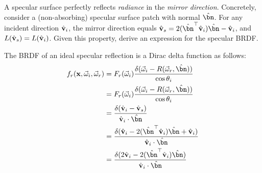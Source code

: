 \begin{problem}
\begin{enumroman}
    \newpage
    \item A specular surface perfectly reflects \emph{radiance} in the
      \emph{mirror direction}. Concretely, consider a (non-absorbing)
      specular surface patch with normal $\hat{\bn}$.
      For any incident direction $\hat{\mathbf{v}}_i$, the mirror direction
      equals $\hat{\bv}_s = 2(\hat{\bn}^\top \hat{\bv}_i)\hat{\bn} - \hat{\bv}_i$,
      and $L(\hat{\mathbf{v}}_s) = L(\hat{\mathbf{v}}_i)$.
      Given this property, derive an expression for the specular BRDF.
      \begin{answer}
        The BRDF of an ideal specular reflection is a Dirac delta function as follows:
        \begin{align*}
          f_r(\bx, \vec{\omega}_i, \vec{\omega}_r) &= F_r(\vec{\omega}_i)
            \frac{\delta(\vec{\omega}_i - R(\vec{\omega}_r, \hat{\bn}))}{\cos \theta_i} \\
          &= F_r(\vec{\omega}_i) \frac{\delta(\vec{\omega}_i - R(\vec{\omega}_r,
            \hat{\bn}))}{\cos \theta_i} \\
          &= \frac{\delta(\hat{\bv}_i - \hat{\bv}_s)}{\hat{\bv}_i \cdot \hat{\bn}} \\
          &= \frac{\delta(\hat{\bv}_i - 2(\hat{\bn}^\top \hat{\bv}_i)\hat{\bn}
            + \hat{\bv}_i)}{\hat{\bv}_i \cdot \hat{\bn}} \\
          &= \frac{\delta(2\hat{\bv}_i - 2(\hat{\bn}^\top \hat{\bv}_i)\hat{\bn})}
              {\hat{\bv}_i \cdot \hat{\bn}}
        \end{align*}
      \end{answer}
  \end{enumroman}
\end{problem}
